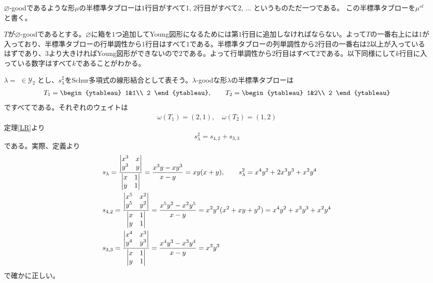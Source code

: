 \documentclass{ltjsarticle}
\begin{document}
\begin{eg}\label{empty-good}
    $\varnothing$-goodであるような形$\mu$の半標準タブローは$1$行目がすべて1, $2$行目がすべて2, ... というものただ一つである。
    この半標準タブローを$\mu^{st}$と書く。

    $T$が$\varnothing$-goodであるとする。$\varnothing$に箱を$1$つ追加してYoung図形になるためには第$1$行目に追加しなければならない。よって$T$の一番右上には$1$が入っており、半標準タブローの行単調性から$1$行目はすべて$1$である。半標準タブローの列単調性から$2$行目の一番右は$2$以上が入っているはずであり、$3$より大きければYoung図形ができないので$2$である。よって行単調性から$2$行目はすべて$2$である。以下同様にして$k$行目に入っている数字はすべて$k$であることがわかる。
\end{eg}

\begin{eg}
    $\lambda=$  $\in\mathcal{Y}_2$ とし、$s_\lambda^2$をSchur多項式の線形結合として表そう。$\lambda$-goodな形$\lambda$の半標準タブローは
    \begin{align*}
        T_1=\begin{ytableau}
            1&1\\
            2
        \end{ytableau},\qquad
        T_2=\begin{ytableau}
            1&2\\
            2
        \end{ytableau}
    \end{align*}
    ですべてである。それぞれのウェイトは
    \begin{align*}
        \omega(T_1)=(2,1),\quad\omega(T_2)=(1,2)
    \end{align*}
    定理\ref{LR}より
    \[
    s_\lambda^2=s_{4,2}+s_{3,3}
    \]
    である。実際、定義より
    \begin{align*}
    &s_\lambda=\frac{\begin{vmatrix} x^3&x\\y^3&y \end{vmatrix}}{\begin{vmatrix} x&1\\y&1 \end{vmatrix}}=\frac{x^3y-xy^3}{x-y}=xy(x+y),\qquad 
    s_\lambda^2=x^4y^2+2x^3y^3+x^2y^4\\
    &s_{4,2}=\frac{\begin{vmatrix} x^5&x^2\\y^5&y^2 \end{vmatrix}}{\begin{vmatrix} x&1\\y&1 \end{vmatrix}}=\frac{x^5y^2-x^2y^5}{x-y}=x^2y^2(x^2+xy+y^2)=x^4y^2+x^3y^3+x^2y^4\\
    &s_{3,3}=\frac{\begin{vmatrix} x^4&x^3\\y^4&y^3 \end{vmatrix}}{\begin{vmatrix} x&1\\y&1 \end{vmatrix}}=\frac{x^4y^3-x^3y^4}{x-y}=x^3y^3
    \end{align*}
    で確かに正しい。

\end{eg}
\end{document}
